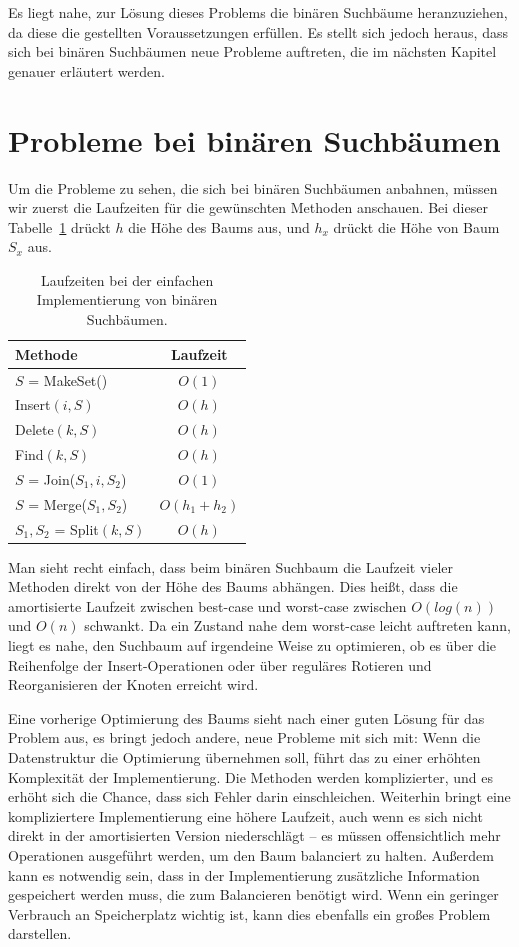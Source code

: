 \documentclass[a4paper]{scrreprt}
\theoremstyle{definition}
\begin{document}
Es liegt nahe, zur Lösung dieses Problems die binären Suchbäume heranzuziehen, da diese die gestellten Voraussetzungen erfüllen.
Es stellt sich jedoch heraus, dass sich bei binären Suchbäumen neue Probleme auftreten, die im nächsten Kapitel genauer erläutert werden.

\section{Probleme bei binären Suchbäumen}
\label{sec:binaryproblems}

Um die Probleme zu sehen, die sich bei binären Suchbäumen anbahnen, müssen wir zuerst die Laufzeiten für die gewünschten Methoden anschauen. Bei dieser Tabelle~\ref{tab:binarytree} drückt $h$ die Höhe des Baums aus, und $h_x$ drückt die Höhe von Baum $S_x$ aus.

\begin{table}
\centering
\begin{tabular}{l|c}
	Methode & Laufzeit\\
	\hline
	$S$ = MakeSet() & $O(1)$\\
	Insert$(i, S)$ & $O(h)$ \\
	Delete$(k, S)$ & $O(h)$ \\
	Find$(k, S)$ & $O(h)$ \\
	$S$ = Join($S_1, i, S_2$) & $O(1)$ \\
	$S$ = Merge($S_1, S_2$) & $O(h_1 + h_2)$ \\
	$S_1, S_2$ = Split$(k, S)$ & $O(h)$
\end{tabular}
\caption[Laufzeiten Binärbaum]{Laufzeiten bei der einfachen Implementierung von binären Suchbäumen.}
\label{tab:binarytree}
\end{table}

Man sieht recht einfach, dass beim binären Suchbaum die Laufzeit vieler Methoden direkt von der Höhe des Baums abhängen.
Dies heißt, dass die amortisierte Laufzeit zwischen best-case und worst-case zwischen $O(log(n))$ und $O(n)$ schwankt.
Da ein Zustand nahe dem worst-case leicht auftreten kann, liegt es nahe, den Suchbaum auf irgendeine Weise zu optimieren, ob es über die Reihenfolge der Insert-Operationen oder über reguläres Rotieren und Reorganisieren der Knoten erreicht wird.

Eine vorherige Optimierung des Baums sieht nach einer guten Lösung für das Problem aus, es bringt jedoch andere, neue Probleme mit sich mit:
Wenn die Datenstruktur die Optimierung übernehmen soll, führt das zu einer erhöhten Komplexität der Implementierung.
Die Methoden werden komplizierter, und es erhöht sich die Chance, dass sich Fehler darin einschleichen.
Weiterhin bringt eine kompliziertere Implementierung eine höhere Laufzeit, auch wenn es sich nicht direkt in der amortisierten Version niederschlägt -- es müssen offensichtlich mehr Operationen ausgeführt werden, um den Baum balanciert zu halten.
Außerdem kann es notwendig sein, dass in der Implementierung zusätzliche Information gespeichert werden muss, die zum Balancieren benötigt wird.
Wenn ein geringer Verbrauch an Speicherplatz wichtig ist, kann dies ebenfalls ein großes Problem darstellen.
\end{document}
